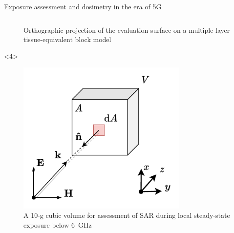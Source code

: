 \documentclass[xcolor=dvipsnames,10pt]{beamer}
\begin{document}
\begin{frame}{Exposure assessment and dosimetry in the era of 5G}
\begin{columns}[c]
\begin{column}{0.5\textwidth}
\begin{onlyenv}
\begin{center}
\begin{figure}
                    \caption{Orthographic projection of the evaluation surface on a multiple-layer tissue-equivalent block model}
                \end{figure}
                \end{center}
            \end{onlyenv}
            \begin{onlyenv}<4>
                \begin{center}
                \begin{figure}
                    \includegraphics[width=0.75\textwidth]{artwork/averaging_volume.pdf}
                    \caption{A 10-g cubic volume for assessment of SAR during local steady-state exposure below \SI{6}{GHz}}
                \end{figure}
                \end{center}
            \end{onlyenv}
        \end{column}
    \end{columns} 
\end{frame}
\end{document}
